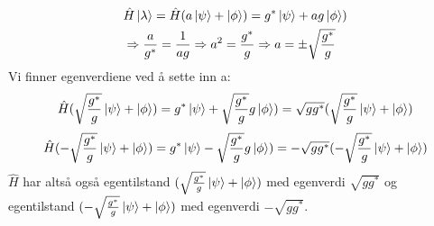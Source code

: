 \documentclass[norsk,a4paper,12pt]{article}
\begin{document}
	\begin{equation*}
	\begin{aligned}
	&\hat{H}\ket{\lambda} = \hat{H}(a\ket{\psi} + \ket{\phi}) = g^*\ket{\psi} + ag\ket{\phi}) \\
	&\Rightarrow \frac{a}{g^*} = \frac{1}{ag} \Rightarrow a^2 = \frac{g^*}{g} \Rightarrow a = \pm \sqrt{\frac{g^*}{g}}
	\end{aligned}
	\end{equation*}
	Vi finner egenverdiene ved å sette inn a:
	\begin{equation*}
	\begin{aligned}
	\hat{H}(\sqrt{\frac{g^*}{g}}\ket{\psi} + \ket{\phi}) = g^*\ket{\psi} + \sqrt{\frac{g^*}{g}}g\ket{\phi}) = \sqrt{gg^*}(\sqrt{\frac{g^*}{g}}\ket{\psi} + \ket{\phi})
	\end{aligned}
	\end{equation*}
	\begin{equation*}
	\begin{aligned}
	\hat{H}(-\sqrt{\frac{g^*}{g}}\ket{\psi} + \ket{\phi}) = g^*\ket{\psi} - \sqrt{\frac{g^*}{g}}g\ket{\phi}) = -\sqrt{gg^*}(-\sqrt{\frac{g^*}{g}}\ket{\psi} + \ket{\phi})
	\end{aligned}
	\end{equation*}
	$\hat{H}$ har altså også egentilstand $(\sqrt{\frac{g^*}{g}}\ket{\psi} + \ket{\phi})$ med egenverdi $\sqrt{gg^*}$ og egentilstand $(-\sqrt{\frac{g^*}{g}}\ket{\psi} + \ket{\phi})$ med egenverdi $-\sqrt{gg^*}$.
	
\end{document}

